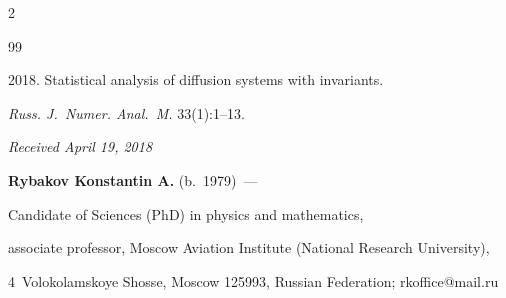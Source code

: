\begin{multicols}{2}
{{\begin{thebibliography}{99}


2018. Statistical analysis of diffusion systems with invariants. 

\textit{Russ. J.~Numer. Anal.~M.} 33(1):1--13.

\end{thebibliography}



 }

 }



\end{multicols}



\vspace*{-6pt}



\hfill{\small\textit{Received April 19, 2018}}













\Contrl



\noindent

\textbf{Rybakov Konstantin A.} (b.\ 1979)~---

Candidate of Sciences (PhD) in physics and mathematics, 

associate professor, Moscow Aviation Institute (National Research University), 

4~Volokolamskoye Shosse, Moscow 125993, Russian Federation; \mbox{rkoffice@mail.ru}





\label{end\stat}



\renewcommand{\bibname}{\protect\rm Литература}       

